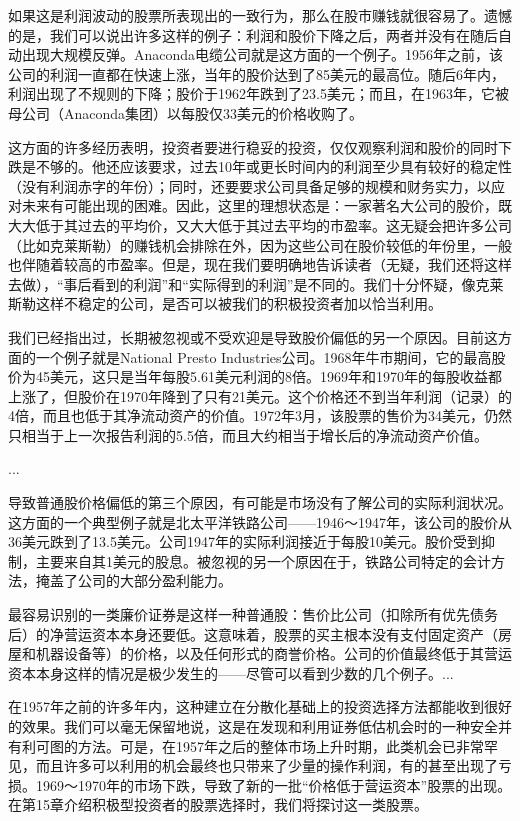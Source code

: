 \documentclass[12pt,oneside]{book}
\begin{document}
如果这是利润波动的股票所表现出的一致行为，那么在股市赚钱就很容易了。遗憾的是，我们可以说出许多这样的例子：利润和股价下降之后，两者并没有在随后自动出现大规模反弹。Anaconda电缆公司就是这方面的一个例子。1956年之前，该公司的利润一直都在快速上涨，当年的股价达到了85美元的最高位。随后6年内，利润出现了不规则的下降；股价于1962年跌到了23.5美元；而且，在1963年，它被母公司（Anaconda集团）以每股仅33美元的价格收购了。

这方面的许多经历表明，投资者要进行稳妥的投资，仅仅观察利润和股价的同时下跌是不够的。他还应该要求，过去10年或更长时间内的利润至少具有较好的稳定性（没有利润赤字的年份）；同时，还要要求公司具备足够的规模和财务实力，以应对未来有可能出现的困难。因此，这里的理想状态是：一家著名大公司的股价，既大大低于其过去的平均价，又大大低于其过去平均的市盈率。这无疑会把许多公司（比如克莱斯勒）的赚钱机会排除在外，因为这些公司在股价较低的年份里，一般也伴随着较高的市盈率。但是，现在我们要明确地告诉读者（无疑，我们还将这样去做），“事后看到的利润”和“实际得到的利润”是不同的。我们十分怀疑，像克莱斯勒这样不稳定的公司，是否可以被我们的积极投资者加以恰当利用。

我们已经指出过，长期被忽视或不受欢迎是导致股价偏低的另一个原因。目前这方面的一个例子就是National Presto Industries公司。1968年牛市期间，它的最高股价为45美元，这只是当年每股5.61美元利润的8倍。1969年和1970年的每股收益都上涨了，但股价在1970年降到了只有21美元。这个价格还不到当年利润（记录）的4倍，而且也低于其净流动资产的价值。1972年3月，该股票的售价为34美元，仍然只相当于上一次报告利润的5.5倍，而且大约相当于增长后的净流动资产价值。

...

导致普通股价格偏低的第三个原因，有可能是市场没有了解公司的实际利润状况。这方面的一个典型例子就是北太平洋铁路公司——1946～1947年，该公司的股价从36美元跌到了13.5美元。公司1947年的实际利润接近于每股10美元。股价受到抑制，主要来自其1美元的股息。被忽视的另一个原因在于，铁路公司特定的会计方法，掩盖了公司的大部分盈利能力。

最容易识别的一类廉价证券是这样一种普通股：售价比公司（扣除所有优先债务后）的净营运资本本身还要低。这意味着，股票的买主根本没有支付固定资产（房屋和机器设备等）的价格，以及任何形式的商誉价格。公司的价值最终低于其营运资本本身这样的情况是极少发生的——尽管可以看到少数的几个例子。...


在1957年之前的许多年内，这种建立在分散化基础上的投资选择方法都能收到很好的效果。我们可以毫无保留地说，这是在发现和利用证券低估机会时的一种安全并有利可图的方法。可是，在1957年之后的整体市场上升时期，此类机会已非常罕见，而且许多可以利用的机会最终也只带来了少量的操作利润，有的甚至出现了亏损。1969～1970年的市场下跌，导致了新的一批“价格低于营运资本”股票的出现。在第15章介绍积极型投资者的股票选择时，我们将探讨这一类股票。
\end{document}
